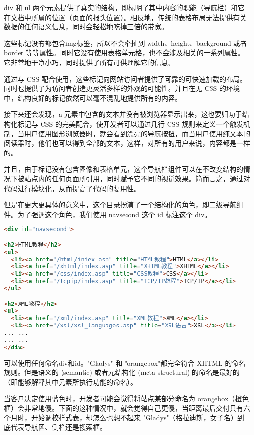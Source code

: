 div 和 ul 两个元素提供了真实的结构，即标明了其中内容的职能（导航栏）和它在文档中所属的位置（页面的报头位置）。相反地，传统的表格布局无法提供有关数据的任何语义信息，同时会轻松地吃掉三倍的带宽。


这些标记没有都包含img标签，所以不会牵扯到 width、height、background 或者 border 等等属性。同时它没有使用表格单元格，也不会涉及相关的一系列属性。它非常地干净小巧，同时提供了所有可供理解它的信息。

通过与 CSS 配合使用，这些标记向网站访问者提供了可靠的可快速加载的布局。同时也提供了为访问者创造更灵活多样的外观的可能性。并且在无 CSS 的环境中，结构良好的标记依然可以毫不混乱地提供所有的内容。

接下来还会发现，a 元素中包含的文本并没有被浏览器显示出来，这也要归功于结构化标记与 CSS 的完美配合，使开发者可以通过几行 CSS 规则来定义一个触发机制，当用户使用图形浏览器时，就会看到漂亮的导航按钮，而当用户使用纯文本的阅读器时，他们也可以得到全部的文本，这样，对所有的用户来说，内容都是一样的。

并且，由于标记没有包含图像和表格单元，这个导航栏组件可以在不改变结构的情况下被站点内的任何页面所引用，同时赋予它不同的视觉效果。简而言之，通过对代码进行模块化，从而提高了代码的复用性。

但是在更大更具体的意义中，这个目录扮演了一个结构化的角色，即二级导航组件。为了强调这个角色，我们使用 navsecond 这个 id 标注这个 div。

\begin{lstlisting}[language=HTML]
<div id="navsecond">

<h2>HTML教程</h2>
<ul>
  <li><a href="/html/index.asp" title="HTML教程">HTML</a></li>
  <li><a href="/xhtml/index.asp" title="XHTML教程">XHTML</a></li>
  <li><a href="/css/index.asp" title="CSS教程">CSS</a></li>
  <li><a href="/tcpip/index.asp" title="TCP/IP教程">TCP/IP</a></li>
</ul>

<h2>XML教程</h2>
<ul>
  <li><a href="/xml/index.asp" title="XML教程">XML</a></li>
  <li><a href="/xsl/xsl_languages.asp" title="XSL语言">XSL</a></li>
... ...
... ...
</div>
\end{lstlisting}

可以使用任何命名div和id。"Gladys" 和 "orangebox"都完全符合 XHTML 的命名规则。但是语义的 (semantic) 或者元结构化 (meta-structural) 的命名是最好的（即能够解释其中元素所执行功能的命名）。

当客户决定使用蓝色时，开发者可能会觉得将站点某部分命名为 orangebox（橙色框）会非常地傻。下面的这种情况中，就会觉得自己更傻，当距离最后交付只有六个月时，开始调校样式表，却怎么也想不起来 "Gladys"（格拉迪斯，女子名）到底代表导航区、侧栏还是搜索框。

